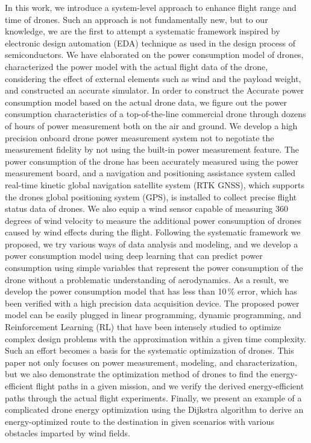 \documentclass[journal]{./template/IEEEtran}
\begin{document}
In this work, we introduce a system-level approach to enhance flight range and time of drones.
Such an approach is not fundamentally new, but to our knowledge, we are the first to attempt a systematic framework {inspired by} electronic design automation (EDA) technique as used in the design process of semiconductors.
We have elaborated on the power consumption model of drones, characterized the power model with the actual flight data of the drone, considering the effect of external elements such as wind and the payload weight, and constructed an accurate simulator.
In order to construct the Accurate power consumption model based on the actual drone data, we figure out the power consumption characteristics of a top-of-the-line commercial drone through dozens of hours of power measurement both on the air and ground.
We develop a high precision onboard drone power measurement system not to negotiate the measurement fidelity by not using the built-in power measurement feature. 
The power consumption of the drone has been accurately measured using the power measurement board, and a navigation and positioning assistance system called real-time kinetic global navigation satellite system (RTK GNSS), which supports the drones global positioning system (GPS), is installed to collect precise flight status data of drones.
We also equip a wind sensor capable of measuring 360 degrees of wind velocity to measure the additional power consumption of drones caused by wind effects during the flight.
Following the systematic framework we proposed, we try various ways of data analysis and modeling, and we develop a power consumption model using deep learning that can predict power consumption using simple variables that represent the power consumption of the drone without a problematic understanding of aerodynamics.
As a result, we develop the power consumption model that has less than 10\,\% error, which has been verified with a high precision data acquisition device.
The proposed power model can be easily plugged in linear programming, dynamic programming, and Reinforcement Learning (RL) that have been intensely studied to optimize complex design problems with the approximation within a given time complexity.
Such an effort becomes a basis for the systematic optimization of drones.
This paper not only focuses on power measurement, modeling, and characterization, but we also demonstrate the optimization method of drones to find the energy-efficient flight paths in a given mission, and we verify the derived energy-efficient paths through the actual flight experiments.
Finally, we present an example of a complicated drone energy optimization using the Dijkstra algorithm to derive an energy-optimized route to the destination in given scenarios with various obstacles imparted by wind fields.
\end{document}
